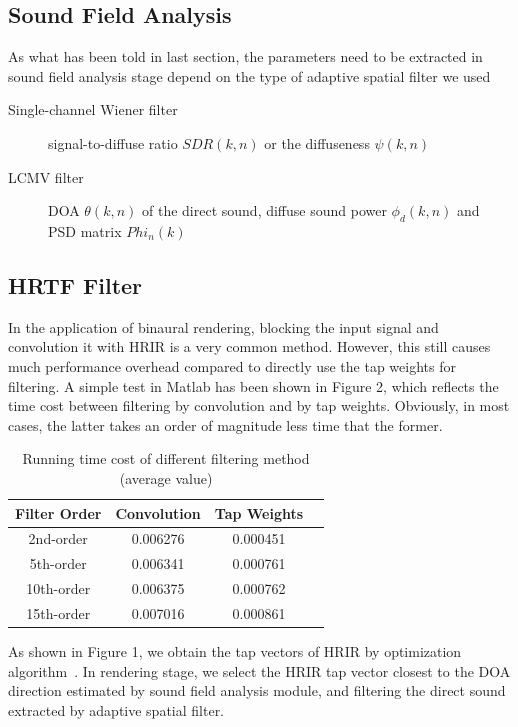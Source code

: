 \documentclass[10pt, a4paper, twocolumn]{article} %
\begin{document}
\subsection{Sound Field Analysis}

As what has been told in last section, the parameters need to be extracted in sound field analysis stage depend on the type of adaptive spatial filter we used

\begin{description}
    \item[Single-channel Wiener filter] signal-to-diffuse ratio $SDR(k,n)$ or the diffuseness $\psi(k,n)$
    \item[LCMV filter] DOA $\theta(k,n)$ of the direct sound, diffuse sound power $\phi_d(k,n)$ and PSD matrix $Phi_n(k)$
\end{description}

\subsection{HRTF Filter}

In the application of binaural rendering, blocking the input signal and convolution it with HRIR is a very common method. However, this still causes much performance overhead compared to directly use the tap weights for filtering. A simple test in Matlab has been shown in Figure 2, which reflects the time cost between filtering by convolution and by tap weights. Obviously, in most cases, the latter takes an order of magnitude less time that the former.

\begin{table}[htbp]
	\centering
	\caption{Running time cost of different filtering method (average value)}
	\begin{tabular}{cccc}
		\toprule  
		Filter Order & Convolution & Tap Weights \\ 
		\midrule  %
		2nd-order & 0.006276 & 0.000451 \\
		\midrule 
		5th-order & 0.006341 & 0.000761 \\
	    \midrule  
	    10th-order & 0.006375 & 0.000762 \\
	    \midrule 
	    15th-order & 0.007016 & 0.000861 \\
		\bottomrule  %
	\end{tabular}
\end{table}

As shown in Figure 1, we obtain the tap vectors of HRIR by optimization algorithm~\parencite{Reference5}. In rendering stage, we select the HRIR tap vector closest to the DOA direction estimated by sound field analysis module, and filtering the direct sound extracted by adaptive spatial filter.
\end{document}

